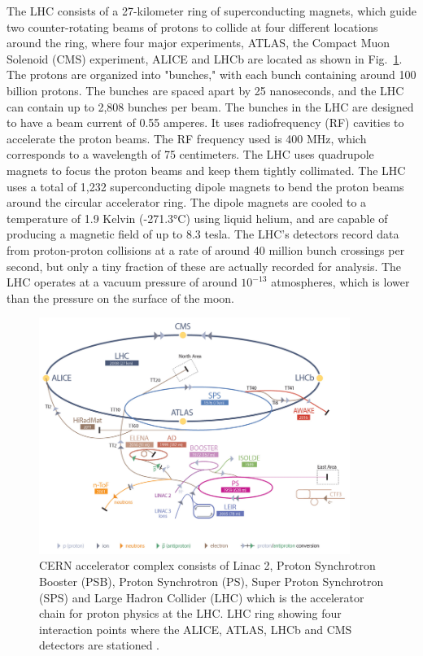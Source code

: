 The LHC consists of a 27-kilometer ring of superconducting magnets, which guide two counter-rotating beams of protons to collide at four different locations around the ring, where four major experiments, ATLAS, the Compact Muon Solenoid (CMS) experiment, ALICE and LHCb are located as shown in Fig.~\ref{fig:lhc}. The protons are organized into "bunches," with each bunch containing around 100 billion protons. The bunches are spaced apart by 25 nanoseconds, and the LHC can contain up to 2,808 bunches per beam. The bunches in the LHC are designed to have a beam current of 0.55 amperes. It uses radiofrequency (RF) cavities to accelerate the proton beams. The RF frequency used is 400 MHz, which corresponds to a wavelength of 75 centimeters. The LHC uses quadrupole magnets to focus the proton beams and keep them tightly collimated. The LHC uses a total of 1,232 superconducting dipole magnets to bend the proton beams around the circular accelerator ring. The dipole magnets are cooled to a temperature of 1.9 Kelvin (-271.3°C) using liquid helium, and are capable of producing a magnetic field of up to 8.3 tesla. The LHC's detectors record data from proton-proton collisions at a rate of around 40 million bunch crossings per second, but only a tiny fraction of these are actually recorded for analysis. The LHC operates at a vacuum pressure of around $10^{-13}$ atmospheres, which is lower than the pressure on the surface of the moon.

\begin{figure}[!htp]
\centering
\includegraphics[width=0.9\textwidth]{ashish_thesis/lhc_schematic.png}
\caption[CERN accelerator complex]{%
    CERN accelerator complex consists of Linac 2, Proton Synchrotron Booster (PSB), Proton Synchrotron (PS), Super Proton Synchrotron (SPS) and Large Hadron Collider (LHC) which is the accelerator chain for proton physics at the LHC. LHC ring showing four interaction points where the ALICE, ATLAS, LHCb and CMS detectors are stationed \cite{lhc_complex}.
}
\label{fig:lhc}
\end{figure}


